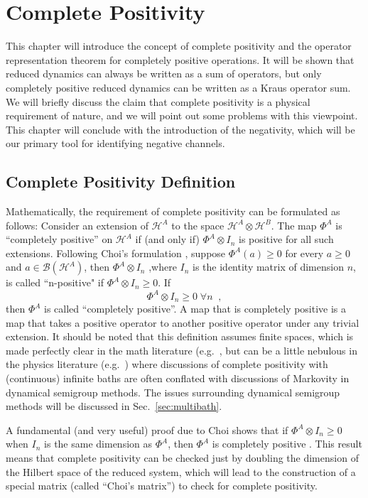 \chapter{Complete Positivity}
This chapter will introduce the concept of complete positivity and the operator representation theorem for completely positive operations.  It will be shown that reduced dynamics can always be written as a sum of operators, but only completely positive reduced dynamics can be written as a Kraus operator sum.  We will briefly discuss the claim that complete positivity is a physical requirement of nature, and we will point out some problems with this viewpoint.  This chapter will conclude with the introduction of the negativity, which will be our primary tool for identifying negative channels.

\section{Complete Positivity Definition}
\label{sec:cpDef}

Mathematically, the requirement of complete positivity can be formulated as follows: Consider an extension of $\mathcal{H}^A$ to the space $\mathcal{H}^A\otimes\mathcal{H}^B$.  The map $\Phi^A$ is ``completely positive'' on $\mathcal{H}^A$ if (and only if) $\Phi^A\otimes I_n$ is positive for all such extensions.  Following Choi's formulation \cite{Choi1972,Choi1975}, suppose $\Phi^A(a) \ge 0$ for every $a\ge 0$ and $a\in\mathcal{B}(\mathcal{H}^A)$, then $\Phi^A\otimes I_n $ ,where $I_n$ is the identity matrix of dimension $n$, is called ``n-positive" if $\Phi^A\otimes I_n \ge 0$.  If
\begin{equation}
\Phi^A\otimes I_n \ge 0 \;\forall n\;\;,
\end{equation}
then $\Phi^A$ is called ``completely positive''.  A map that is completely positive is a map that takes a positive operator to another positive operator under any trivial extension.  It should be noted that this definition assumes finite spaces, which is made perfectly clear in the math literature (e.g.\ \cite{Choi1975,Stinespring1955}, but can be a little nebulous in the physics literature (e.g.\ \cite{Benatti2005}) where discussions of complete positivity with (continuous) infinite baths are often conflated with discussions of Markovity in dynamical semigroup methods.  The issues surrounding dynamical semigroup methods will be discussed in Sec.\ \ref{sec:multibath}.

A fundamental (and  very useful) proof due to Choi shows that if $\Phi^A\otimes I_n \ge 0$ when $I_n$ is the same dimension as $\Phi^A$, then $\Phi^A$ is completely positive \cite{Choi1972,Choi1975}.  This result means that complete positivity can be checked just by doubling the dimension of the Hilbert space of the reduced system, which will lead to the construction of a special matrix (called ``Choi's matrix'') to check for complete positivity.

